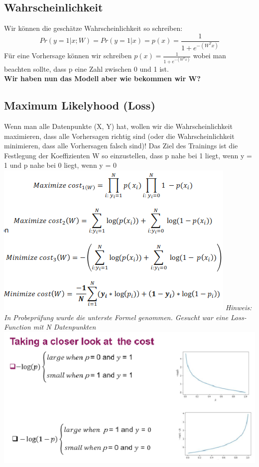 \subsection{Wahrscheinlichkeit}
Wir können die geschätze Wahrscheinlichkeit so schreiben:
$$Pr(y=1|x;W) = Pr(y=1 | x) = p(x) = \frac{1}{1+e^{-(W^Tx)}}$$
Für eine Vorhersage können wir schreiben $ p(x) = \frac{1}{1+e^{-(W^Tx)}}$ wobei man beachten sollte, dass p eine Zahl zwischen 0 und 1 ist.\\
\textbf{Wir haben nun das Modell aber wie bekommen wir W?}
\subsection{Maximum Likelyhood (Loss)}
Wenn man alle Datenpunkte (X, Y) hat, wollen wir die Wahrscheinlichkeit maximieren, dass alle Vorhersagen richtig sind (oder die Wahrscheinlichkeit minimieren, dass alle Vorhersagen falsch sind)!
Das Ziel des Trainings ist die Festlegung der Koeffizienten W so einzustellen, dass p nahe bei 1 liegt, wenn y = 1 und p nahe bei 0 liegt, wenn y = 0
\includegraphics[width=\linewidth]{img/maximum_likelyhood.png}
\textit{Hinweis: In Probeprüfung wurde die unterste Formel genommen. Gesucht war eine Loss-Function mit N Datenpunkten}
\includegraphics[width=\linewidth]{img/maximum_likelyhood_cost.png}